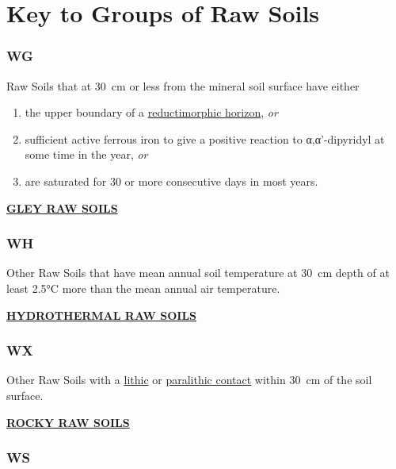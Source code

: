 \documentclass[
  letterpaper,
  DIV=11,
  numbers=noendperiod]{scrreprt}
\providecommand{\tightlist}{%
  \setlength{\itemsep}{0pt}\setlength{\parskip}{0pt}}\usepackage{longtable,booktabs,array}
\begin{document}
\hypertarget{sec-grp-W}{%
\section{Key to Groups of Raw Soils}\label{sec-grp-W}}

\hypertarget{sec-key-WG}{%
\subsubsection{\texorpdfstring{\textbf{WG}}{WG}}\label{sec-key-WG}}

Raw Soils that at 30~cm or less from the mineral soil surface have
either

\begin{enumerate}
\def\labelenumi{\arabic{enumi}.}
\tightlist
\item
  the upper boundary of a
  \protect\hyperlink{sec-diag-redmh}{reductimorphic horizon}, \emph{or}
\item
  sufficient active ferrous iron to give a positive reaction to
  α,α'-dipyridyl at some time in the year, \emph{or}
\item
  are saturated for 30 or more consecutive days in most years.
\end{enumerate}

\protect\hyperlink{sec-WG}{\textbf{GLEY RAW SOILS}}

\hypertarget{sec-key-WH}{%
\subsubsection{\texorpdfstring{\textbf{WH}}{WH}}\label{sec-key-WH}}

Other Raw Soils that have mean annual soil temperature at 30~cm depth of
at least 2.5°C more than the mean annual air temperature.

\protect\hyperlink{sec-WH}{\textbf{HYDROTHERMAL RAW SOILS}}

\hypertarget{sec-key-WX}{%
\subsubsection{\texorpdfstring{\textbf{WX}}{WX}}\label{sec-key-WX}}

Other Raw Soils with a \protect\hyperlink{sec-diag-lithc}{lithic} or
\protect\hyperlink{sec-diag-lithp}{paralithic contact} within 30~cm of
the soil surface.

\protect\hyperlink{sec-WX}{\textbf{ROCKY RAW SOILS}}

\hypertarget{sec-key-WS}{%
\subsubsection{\texorpdfstring{\textbf{WS}}{WS}}\label{sec-key-WS}}
\end{document}
